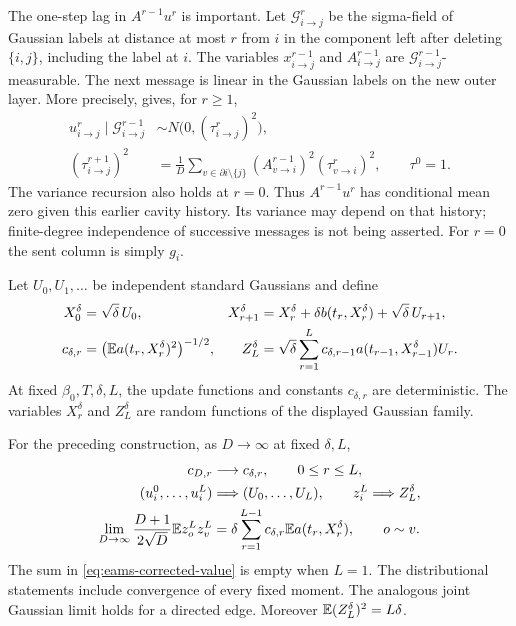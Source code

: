 The one-step lag in $A^{r-1}u^r$ is important. Let
$\mathcal G_{i\to j}^r$ be the sigma-field of Gaussian labels at
distance at most $r$ from $i$ in the component left after deleting
$\{i,j\}$, including the label at $i$. The variables
$x^{r-1}_{i\to j}$ and $A^{r-1}_{i\to j}$ are
$\mathcal G_{i\to j}^{r-1}$-measurable. The next message is linear
in the Gaussian labels on the new outer layer. More precisely,
\cite[Lemma~3.2]{EAMS2023} gives, for $r\ge1$,
\begin{equation}
 \begin{aligned}
 u^r_{i\to j}\mid\mathcal G_{i\to j}^{r-1}
       &\sim N\bigl(0,(\tau^r_{i\to j})^2\bigr),\\
 (\tau^{r+1}_{i\to j})^2
       &=\frac1D\sum_{v\in\partial i\setminus\{j\}}
       (A^{r-1}_{v\to i})^2(\tau^r_{v\to i})^2,
       \qquad \tau^0=1.
 \end{aligned}
 \label{eq:eams-conditional-innovation}
\end{equation}
The variance recursion also holds at $r=0$. Thus $A^{r-1}u^r$
has conditional mean zero given this earlier cavity history. Its
variance may depend on that history; finite-degree independence of
successive messages is not being asserted. For $r=0$ the sent column
is simply $g_i$.

Let $U_0,U_1,\ldots$ be independent standard Gaussians and define
\begin{align}
 X^\delta_0&=\sqrt\delta\,U_0,
 &X^\delta_{r+1}
  &=X^\delta_r+\delta b(t_r,X^\delta_r)+\sqrt\delta\,U_{r+1},
 \label{eq:eams-limit-euler}\\
 c_{\delta,r}&=\bigl(\mathbb E a(t_r,X^\delta_r)^2\bigr)^{-1/2},
 &Z^\delta_L
  &=\sqrt\delta\sum_{r=1}^L
        c_{\delta,r-1}a(t_{r-1},X^\delta_{r-1})U_r.
 \label{eq:eams-limit-output}
\end{align}
At fixed $\beta_0,T,\delta,L$, the update functions and constants
$c_{\delta,r}$ are deterministic. The variables $X^\delta_r$ and
$Z^\delta_L$ are random functions of the displayed Gaussian family.

\begin{lemma}
\label{lem:eams-finite-step}
For the preceding construction, as $D\to\infty$ at fixed $\delta,L$,
\begin{align}
 c_{D,r}&\longrightarrow c_{\delta,r},
 \qquad 0\le r\le L,
 \label{eq:eams-normalizer-limit}\\
 (u^0_i,\ldots,u^L_i)&\Longrightarrow(U_0,\ldots,U_L),
 \qquad z_i^L\Longrightarrow Z^\delta_L,
 \label{eq:eams-distribution-limit}\\
 \lim_{D\to\infty}\frac{D+1}{2\sqrt D}\mathbb E z_o^Lz_v^L
   &=\delta\sum_{r=1}^{L-1}
               c_{\delta,r}\mathbb E a(t_r,X^\delta_r),
 \qquad o\sim v.
 \label{eq:eams-corrected-value}
\end{align}
The sum in \eqref{eq:eams-corrected-value} is empty when $L=1$.
The distributional statements include convergence of every fixed
moment.  The analogous joint Gaussian limit holds for a directed edge.
Moreover $\mathbb E(Z^\delta_L)^2=L\delta$.
\end{lemma}

